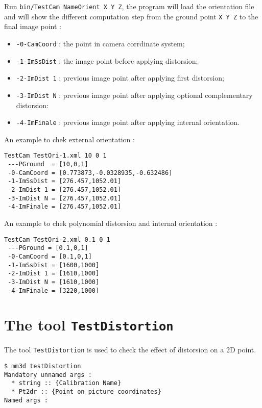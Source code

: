 Run {\tt bin/TestCam NameOrient X Y Z},  the program will load the
orientation file and will show the different computation step from
the ground point {\tt X Y Z} to the final image point :


\begin{itemize}
   \item  {\tt -0-CamCoord} : the point in camera corrdinate system;
   \item  {\tt -1-ImSsDist} : the image point before applying distorsion;
   \item  {\tt -2-ImDist 1} : previous image point after applying first distorsion;
   \item  {\tt -3-ImDist N} : previous image point after applying optional complementary distorsion:
   \item  {\tt -4-ImFinale} : previous image point after applying internal orientation.
\end{itemize}

An example  to chek external orientation :

\begin{verbatim}
TestCam TestOri-1.xml 10 0 1
 ---PGround  = [10,0,1]
 -0-CamCoord = [0.773873,-0.0328935,-0.632486]
 -1-ImSsDist = [276.457,1052.01]
 -2-ImDist 1 = [276.457,1052.01]
 -3-ImDist N = [276.457,1052.01]
 -4-ImFinale = [276.457,1052.01]
\end{verbatim}


An example  to chek polynomial distorsion and internal orientation :

\begin{verbatim}
TestCam TestOri-2.xml 0.1 0 1
 ---PGround = [0.1,0,1]
 -0-CamCoord = [0.1,0,1]
 -1-ImSsDist = [1600,1000]
 -2-ImDist 1 = [1610,1000]
 -3-ImDist N = [1610,1000]
 -4-ImFinale = [3220,1000]
\end{verbatim}


\section{The tool {\tt TestDistortion}}

The tool {\tt TestDistortion} is used to check the effect of distorsion on a 2D point.
\begin{verbatim}
$ mm3d testDistortion
Mandatory unnamed args : 
  * string :: {Calibration Name}
  * Pt2dr :: {Point on picture coordinates}
Named args : 
\end{verbatim}

